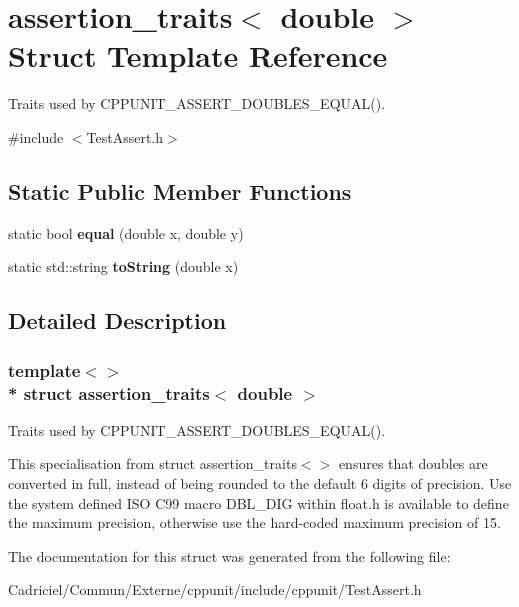 \hypertarget{structassertion__traits_3_01double_01_4}{}\section{assertion\+\_\+traits$<$ double $>$ Struct Template Reference}
\label{structassertion__traits_3_01double_01_4}


Traits used by C\+P\+P\+U\+N\+I\+T\+\_\+\+A\+S\+S\+E\+R\+T\+\_\+\+D\+O\+U\+B\+L\+E\+S\+\_\+\+E\+Q\+U\+A\+L().  




{\ttfamily \#include $<$Test\+Assert.\+h$>$}

\subsection*{Static Public Member Functions}
\begin{DoxyCompactItemize}
\item 
static bool {\bfseries equal} (double x, double y)\hypertarget{structassertion__traits_3_01double_01_4_ac0d9d71ec0f239664b88188e481c0598}{}\label{structassertion__traits_3_01double_01_4_ac0d9d71ec0f239664b88188e481c0598}

\item 
static std\+::string {\bfseries to\+String} (double x)\hypertarget{structassertion__traits_3_01double_01_4_a6bc37874eb60d30e0b50d4c127ab34df}{}\label{structassertion__traits_3_01double_01_4_a6bc37874eb60d30e0b50d4c127ab34df}

\end{DoxyCompactItemize}


\subsection{Detailed Description}
\subsubsection*{template$<$$>$\\*
struct assertion\+\_\+traits$<$ double $>$}

Traits used by C\+P\+P\+U\+N\+I\+T\+\_\+\+A\+S\+S\+E\+R\+T\+\_\+\+D\+O\+U\+B\+L\+E\+S\+\_\+\+E\+Q\+U\+A\+L(). 

This specialisation from {\ttfamily struct} {\ttfamily assertion\+\_\+traits$<$$>$} ensures that doubles are converted in full, instead of being rounded to the default 6 digits of precision. Use the system defined I\+SO C99 macro D\+B\+L\+\_\+\+D\+IG within float.\+h is available to define the maximum precision, otherwise use the hard-\/coded maximum precision of 15. 

The documentation for this struct was generated from the following file\+:\begin{DoxyCompactItemize}
\item 
Cadriciel/\+Commun/\+Externe/cppunit/include/cppunit/Test\+Assert.\+h\end{DoxyCompactItemize}
